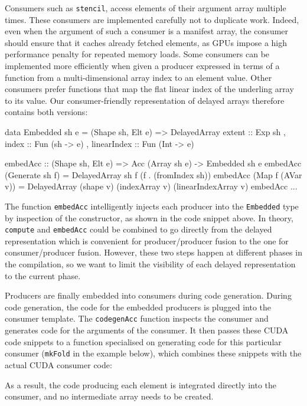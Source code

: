 Consumers such as \texttt{stencil}, access elements of their argument array multiple times. These consumers are implemented carefully not to duplicate work. Indeed, even when the argument of such a consumer is a manifest array, the consumer should ensure that it caches already fetched elements, as GPUs impose a high performance penalty for repeated memory loads. Some consumers can be implemented more efficiently when given a producer expressed in terms of a function from a multi-dimensional array index to an element value. Other consumers prefer functions that map the flat linear index of the underling array to its value. Our consumer-friendly representation of delayed arrays therefore contains both versions: 
%
\begin{code}
data Embedded sh e
  =  (Shape sh, Elt e) 
  => DelayedArray { extent      :: Exp sh
                  , index       :: Fun (sh  -> e)
                  , linearIndex :: Fun (Int -> e) }

embedAcc :: (Shape sh, Elt e) 
         => Acc (Array sh e) -> Embedded sh e
embedAcc (Generate sh f)  
  = DelayedArray sh f (f . (fromIndex sh))
embedAcc (Map f (AVar v)) 
  = DelayedArray (shape v) (indexArray v) 
                           (linearIndexArray v)
embedAcc ...
\end{code}
%
The function \texttt{embedAcc} intelligently injects each producer into the \texttt{Embedded} type by inspection of the constructor, as shown in the code snippet above. In theory, \texttt{compute} and \texttt{embedAcc} could be combined to go directly from the delayed representation which is convenient for producer/producer fusion to the one for consumer/producer fusion. However, these two steps happen at different phases in the compilation, so we want to limit the visibility of each delayed representation to the current phase.

Producers are finally embedded into consumers during code generation. During code generation, the code for the embedded producers is plugged into the consumer template. The \texttt{codegenAcc} function inspects the consumer and generates code for the arguments of the consumer. It then passes these CUDA code snippets to a function specialised on generating code for this particular consumer (\texttt{mkFold} in the example below), which combines these snippets with the actual CUDA consumer code:
%
As a result, the code producing each element is integrated directly into the consumer, and no intermediate array needs to be created.


